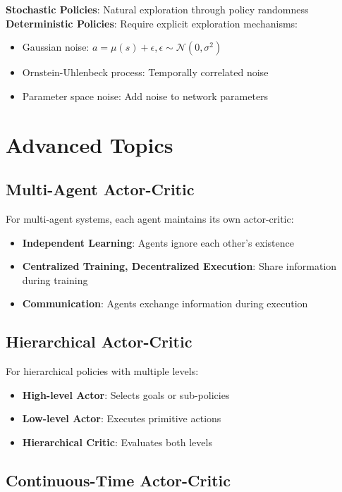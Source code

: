 \textbf{Stochastic Policies}: Natural exploration through policy randomness
\textbf{Deterministic Policies}: Require explicit exploration mechanisms:
\begin{itemize}
    \item Gaussian noise: $a = \mu(s) + \epsilon, \epsilon \sim \mathcal{N}(0, \sigma^2)$
    \item Ornstein-Uhlenbeck process: Temporally correlated noise
    \item Parameter space noise: Add noise to network parameters
\end{itemize}

\section{Advanced Topics}

\subsection{Multi-Agent Actor-Critic}

For multi-agent systems, each agent maintains its own actor-critic:
\begin{itemize}
    \item \textbf{Independent Learning}: Agents ignore each other's existence
    \item \textbf{Centralized Training, Decentralized Execution}: Share information during training
    \item \textbf{Communication}: Agents exchange information during execution
\end{itemize}

\subsection{Hierarchical Actor-Critic}

For hierarchical policies with multiple levels:
\begin{itemize}
    \item \textbf{High-level Actor}: Selects goals or sub-policies
    \item \textbf{Low-level Actor}: Executes primitive actions
    \item \textbf{Hierarchical Critic}: Evaluates both levels
\end{itemize}

\subsection{Continuous-Time Actor-Critic}

